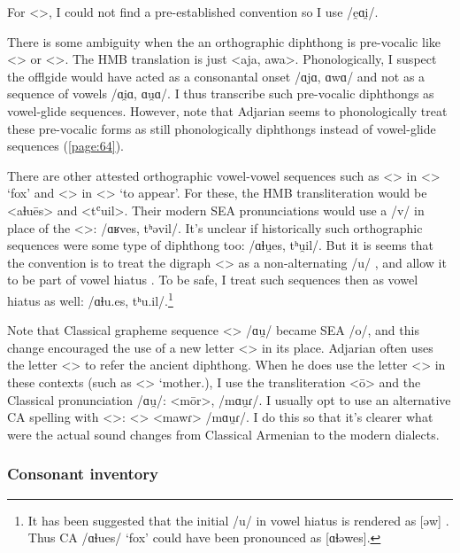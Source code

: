 For <>, I could not find a pre-established convention so I use /e̯ɑi̯/. 
	
There is some ambiguity when the an orthographic diphthong is pre-vocalic like <> or <>. The HMB translation is just <aja, awa>. Phonologically, I suspect the offlgide would have acted as a consonantal onset /ɑjɑ, ɑwɑ/ and not as a sequence of vowels /ɑi̯ɑ, ɑu̯ɑ/. I thus transcribe such pre-vocalic diphthongs as vowel-glide sequences. However, note that Adjarian seems to phonologically treat these pre-vocalic forms as still phonologically diphthongs instead of vowel-glide sequences (\ref{page:64}). 




There are other attested orthographic vowel-vowel sequences such as <> in <> `fox' and <> in <> `to appear'. For these, the HMB transliteration would be <aɬuēs> and <tʿuil>. Their modern SEA pronunciations would use a /v/ in place of the <>: /ɑʁves, tʰəvil/. It's unclear if historically such orthographic sequences were some type of diphthong too: /ɑɬu̯es, tʰu̯il/. But it is seems that the convention is to treat the digraph <> as a non-alternating /u/ \citep[15]{Thomson-1989-IntroClassicalArmenian}, and allow it to be part of vowel hiatus \citep[17]{Thomson-1989-IntroClassicalArmenian}. To be safe, I treat such sequences then as vowel hiatus as well: /ɑɬu.es, tʰu.il/.\footnote{It has been suggested that the initial /u/ in vowel hiatus is rendered as [əw] \citep[13]{Kim-2021-phoneticsPhonologyOldArmenianWV}. Thus CA /ɑɬues/ `fox' could have been pronounced as [ɑɬəwes].  }

Note that Classical grapheme sequence <> /ɑu̯/ became SEA /o/, and this change encouraged the use of a new letter <> in its place. Adjarian often uses the letter <> to refer the ancient diphthong. When he does use the letter <> in these contexts (such as <> `mother.{\gen}), I use the transliteration <ō> and the Classical pronunciation /ɑu̯/: <mōr>, /mɑu̯ɾ/. I usually opt to use an alternative CA spelling with <>: <> <mawɾ> /mɑu̯ɾ/. I do this so that it's clearer what were the actual sound changes from Classical Armenian to the modern dialects. 


\subsubsection{Consonant inventory}\label{sec:HossepIntro:phonotransc:CA:cons}



